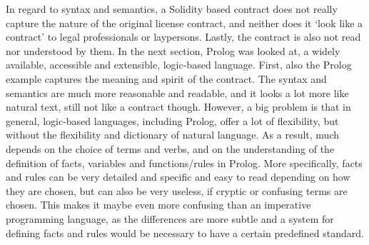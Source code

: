 \documentclass{article}
\newtheorem{example}{Example}
\begin{document}
In regard to syntax and semantics, a Solidity based contract does not really capture the nature of the original license contract, and neither does it ‘look like a contract’ to legal professionals or laypersons. Lastly, the contract is also not read nor understood by them.
In the next section, %
Prolog was looked at, a widely available, accessible and extensible, logic-based language. 
First, also the Prolog example captures the meaning and spirit of the contract. The syntax and semantics are much more reasonable and readable, and it looks a lot more like natural text, still not like a contract though. However, a big problem is that in general, logic-based languages, including Prolog, offer a lot of flexibility, but without the flexibility and dictionary of natural language. As a result, much depends on the choice of terms and verbs, %
and on the understanding of the definition of facts, variables and functions/rules in Prolog. More specifically, facts and rules can be very detailed and specific and easy to read depending on how they are chosen, but can also be very useless, if cryptic or confusing terms are chosen.
This makes it maybe even more confusing than an imperative programming language, as the differences are more subtle and a system for defining facts and rules would be necessary to have a certain predefined standard.
\end{document}
